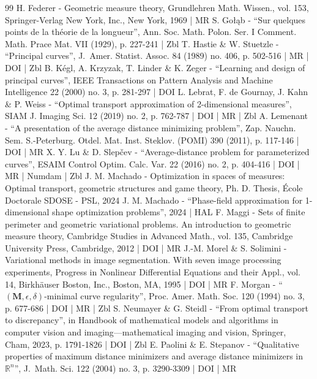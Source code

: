 \begin{thebibliography}{99}
H. Federer - Geometric measure theory, Grundlehren Math. Wissen., vol. 153, Springer-Verlag New York, Inc., New York, 1969 | MR
S. Gołąb - “Sur quelques points de la théorie de la longueur”, Ann. Soc. Math. Polon. Ser. I Comment. Math. Prace Mat. VII (1929), p. 227-241 | Zbl
T. Hastie \& W. Stuetzle - “Principal curves”, J. Amer. Statist. Assoc. 84 (1989) no. 406, p. 502-516 | MR | DOI | Zbl
B. Kégl, A. Krzyzak, T. Linder \& K. Zeger - “Learning and design of principal curves”, IEEE Transactions on Pattern Analysis and Machine Intelligence 22 (2000) no. 3, p. 281-297 | DOI
L. Lebrat, F. de Gournay, J. Kahn \& P. Weiss - “Optimal transport approximation of 2-dimensional measures”, SIAM J. Imaging Sci. 12 (2019) no. 2, p. 762-787 | DOI | MR | Zbl
A. Lemenant - “A presentation of the average distance minimizing problem”, Zap. Nauchn. Sem. S.-Peterburg. Otdel. Mat. Inst. Steklov. (POMI) 390 (2011), p. 117-146 | DOI | MR
X. Y. Lu \& D. Slepčev - “Average-distance problem for parameterized curves”, ESAIM Control Optim. Calc. Var. 22 (2016) no. 2, p. 404-416 | DOI | MR | Numdam | Zbl
J. M. Machado - Optimization in spaces of measures: Optimal transport, geometric structures and game theory, Ph. D. Thesis, École Doctorale SDOSE - PSL, 2024
J. M. Machado - “Phase-field approximation for 1-dimensional shape optimization problems”, 2024 | HAL
F. Maggi - Sets of finite perimeter and geometric variational problems. An introduction to geometric measure theory, Cambridge Studies in Advanced Math., vol. 135, Cambridge University Press, Cambridge, 2012 | DOI | MR
J.-M. Morel \& S. Solimini - Variational methods in image segmentation. With seven image processing experiments, Progress in Nonlinear Differential Equations and their Appl., vol. 14, Birkhäuser Boston, Inc., Boston, MA, 1995 | DOI | MR
F. Morgan - “$({\mathbf{M}},\epsilon ,\delta )$-minimal curve regularity”, Proc. Amer. Math. Soc. 120 (1994) no. 3, p. 677-686 | DOI | MR | Zbl
S. Neumayer \& G. Steidl - “From optimal transport to discrepancy”, in Handbook of mathematical models and algorithms in computer vision and imaging—mathematical imaging and vision, Springer, Cham, 2023, p. 1791-1826 | DOI | Zbl
E. Paolini \& E. Stepanov - “Qualitative properties of maximum distance minimizers and average distance minimizers in ${\mathbb{R}}^n$”, J. Math. Sci. 122 (2004) no. 3, p. 3290-3309 | DOI | MR

\end{thebibliography}
